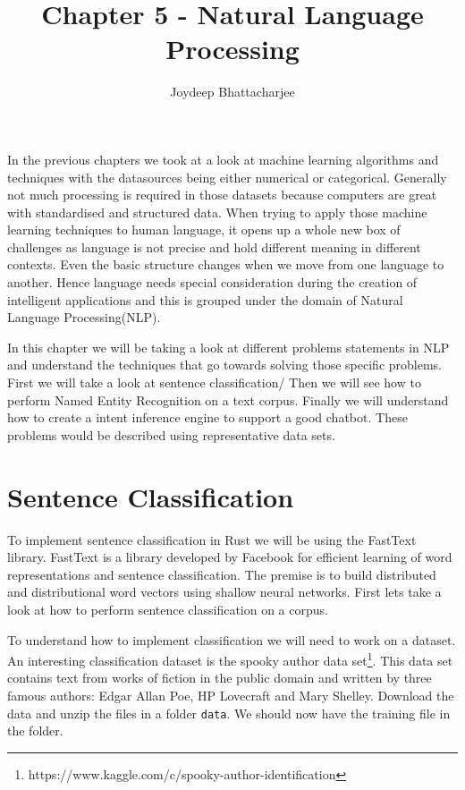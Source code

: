 \documentclass{book}
\begin{document}
\title{Chapter 5 - Natural Language Processing}
\author {Joydeep Bhattacharjee}

\maketitle


In the previous chapters we took at a look at machine learning algorithms and techniques with the datasources being either numerical or categorical. Generally not much processing is required in those datasets because computers are great with standardised and structured data. When trying to apply those machine learning techniques to human language, it opens up a whole new box of challenges as language is not precise and hold different meaning in different contexts. Even the basic structure changes when we move from one language to another. Hence language needs special consideration during the creation of intelligent applications and this is grouped under the domain of Natural Language Processing(NLP).

In this chapter we will be taking a look at different problems statements in NLP and understand the techniques that go towards solving those specific problems. First we will take a look at sentence classification/ Then we will see how to perform Named Entity Recognition on a text corpus. Finally we will understand how to create a intent inference engine to support a good chatbot. These problems would be described using representative data sets.

\section{Sentence Classification}%
To implement sentence classification in Rust we will be using the FastText library. FastText is a library developed by Facebook for efficient learning of word representations and sentence classification. The premise is to build distributed and distributional word vectors using shallow neural networks. First lets take a look at how to perform sentence classification on a corpus.

To understand how to implement classification we will need to work on a dataset. An interesting classification dataset is the spooky author data set\footnote{https://www.kaggle.com/c/spooky-author-identification}. This data set contains text from works of fiction in the public domain and written by three famous authors: Edgar Allan Poe, HP Lovecraft and Mary Shelley. Download the data and unzip the files in a folder \lstinline{data}. We should now have the training file in the folder.
\end{document}
